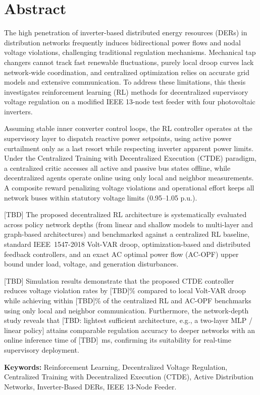 \chapter*{Abstract}

The high penetration of inverter-based distributed energy resources (DERs) in distribution networks frequently induces bidirectional power flows and nodal voltage violations, challenging traditional regulation mechanisms. Mechanical tap changers cannot track fast renewable fluctuations, purely local droop curves lack network-wide coordination, and centralized optimization relies on accurate grid models and extensive communication. To address these limitations, this thesis investigates reinforcement learning (RL) methods for decentralized supervisory voltage regulation on a modified IEEE 13-node test feeder with four photovoltaic inverters.

Assuming stable inner converter control loops, the RL controller operates at the supervisory layer to dispatch reactive power setpoints, using active power curtailment only as a last resort while respecting inverter apparent power limits. Under the Centralized Training with Decentralized Execution (CTDE) paradigm, a centralized critic accesses all active and passive bus states offline, while decentralized agents operate online using only local and neighbor measurements. A composite reward penalizing voltage violations and operational effort keeps all network buses within statutory voltage limits (0.95--1.05 p.u.).

[TBD] The proposed decentralized RL architecture is systematically evaluated across policy network depths (from linear and shallow models to multi-layer and graph-based architectures) and benchmarked against a centralized RL baseline, standard IEEE~1547-2018 Volt-VAR droop, optimization-based and distributed feedback controllers, and an exact AC optimal power flow (AC-OPF) upper bound under load, voltage, and generation disturbances.

[TBD] Simulation results demonstrate that the proposed CTDE controller reduces voltage violation rates by [TBD]\% compared to local Volt-VAR droop while achieving within [TBD]\% of the centralized RL and AC-OPF benchmarks using only local and neighbor communication. Furthermore, the network-depth study reveals that [TBD: lightest sufficient architecture, e.g., a two-layer MLP / linear policy] attains comparable regulation accuracy to deeper networks with an online inference time of [TBD]~ms, confirming its suitability for real-time supervisory deployment.

\vspace{1.2em}
\noindent\textbf{Keywords:} Reinforcement Learning, Decentralized Voltage Regulation, Centralized Training with Decentralized Execution (CTDE), Active Distribution Networks, Inverter-Based DERs, IEEE 13-Node Feeder.
